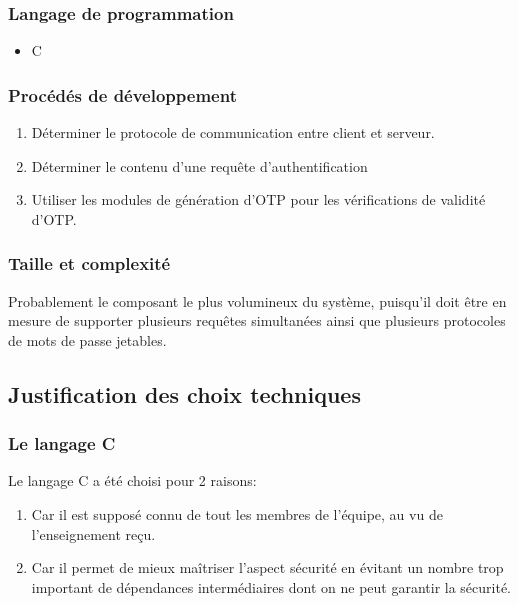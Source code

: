 \documentclass{"../../res/univ-projet"}
\begin{document}
    \subsubsection{Langage de programmation}
    \begin{itemize}
        \item C
    \end{itemize}

    \subsubsection{Procédés de développement}
    \begin{enumerate}
        \item Déterminer le protocole de communication entre client et serveur.
        \item Déterminer le contenu d'une requête d'authentification
        \item Utiliser les modules de génération d'OTP pour les vérifications de
        validité d'OTP.
    \end{enumerate}        

    \subsubsection{Taille et complexité}
    Probablement le composant le plus volumineux du système, puisqu'il doit être
    en mesure de supporter plusieurs requêtes simultanées ainsi que plusieurs
    protocoles de mots de passe jetables.


\subsection{Justification des choix techniques}
\subsubsection{Le langage C}
Le langage C a été choisi pour 2 raisons:
\begin{enumerate}
    \item Car il est supposé connu de tout les membres de l'équipe, au vu
        de l'enseignement reçu.
    \item Car il permet de mieux maîtriser l'aspect sécurité en évitant un
        nombre trop important de dépendances intermédiaires dont on ne peut
        garantir la sécurité.
\end{enumerate}

\end{document}
